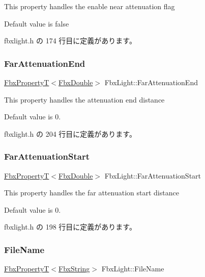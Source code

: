 This property handles the enable near attenuation flag

Default value is false 

 fbxlight.\+h の 174 行目に定義があります。

\mbox{\label{class_fbx_light_a2bb8f1a2eaba27196db363efe4cae050}} 
\subsubsection{\texorpdfstring{Far\+Attenuation\+End}{FarAttenuationEnd}}
{\footnotesize\ttfamily \hyperlink{class_fbx_property_t}{Fbx\+PropertyT}$<$\hyperlink{fbxtypes_8h_a171e72a1c46fc15c1a6c9c31948c1c5b}{Fbx\+Double}$>$ Fbx\+Light\+::\+Far\+Attenuation\+End}

This property handles the attenuation end distance

Default value is 0. 

 fbxlight.\+h の 204 行目に定義があります。

\mbox{\label{class_fbx_light_ac28fb5441eded0c0cf73d1e3efcf92bc}} 
\subsubsection{\texorpdfstring{Far\+Attenuation\+Start}{FarAttenuationStart}}
{\footnotesize\ttfamily \hyperlink{class_fbx_property_t}{Fbx\+PropertyT}$<$\hyperlink{fbxtypes_8h_a171e72a1c46fc15c1a6c9c31948c1c5b}{Fbx\+Double}$>$ Fbx\+Light\+::\+Far\+Attenuation\+Start}

This property handles the far attenuation start distance

Default value is 0. 

 fbxlight.\+h の 198 行目に定義があります。

\mbox{\label{class_fbx_light_aeb6d0d316710f03e0f4aeb0376e1e376}} 
\subsubsection{\texorpdfstring{File\+Name}{FileName}}
{\footnotesize\ttfamily \hyperlink{class_fbx_property_t}{Fbx\+PropertyT}$<$\hyperlink{class_fbx_string}{Fbx\+String}$>$ Fbx\+Light\+::\+File\+Name}

